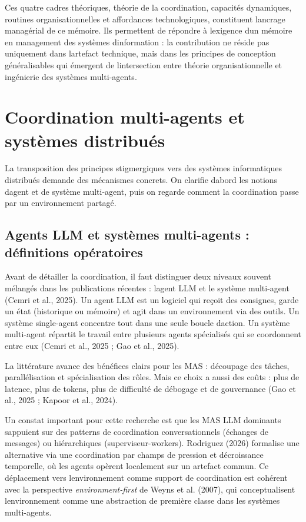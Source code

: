 \documentclass[12pt,a4paper]{article}
\begin{document}
Ces quatre cadres théoriques, théorie de la coordination, capacités
dynamiques, routines organisationnelles et affordances technologiques,
constituent l\textquotesingle ancrage managérial de ce mémoire. Ils
permettent de répondre à l\textquotesingle exigence d\textquotesingle un
mémoire en management des systèmes d\textquotesingle information : la
contribution ne réside pas uniquement dans l\textquotesingle artefact
technique, mais dans les principes de conception
généralisables qui émergent de
l\textquotesingle intersection entre théorie organisationnelle et
ingénierie des systèmes multi-agents.

\section{Coordination multi-agents et systèmes
distribués}\label{coordination-multi-agents-et-systuxe8mes-distribuuxe9s}

La transposition des principes stigmergiques vers des systèmes
informatiques distribués demande des mécanismes concrets. On clarifie
d\textquotesingle abord les notions d\textquotesingle agent et de
système multi-agent, puis on regarde comment la coordination passe par
un environnement partagé.

\subsection{Agents LLM et systèmes multi-agents : définitions
opératoires}\label{agents-llm-et-systuxe8mes-multi-agents--duxe9finitions-opuxe9ratoires}

Avant de détailler la coordination, il faut distinguer deux niveaux
souvent mélangés dans les publications récentes :
l\textquotesingle agent LLM et le système multi-agent (Cemri et al.,
2025). Un agent LLM est un logiciel qui reçoit des consignes, garde un
état (historique ou mémoire) et agit dans un environnement via des
outils. Un système single-agent concentre tout dans une seule boucle
d\textquotesingle action. Un système multi-agent répartit le travail
entre plusieurs agents spécialisés qui se coordonnent entre eux (Cemri
et al., 2025 ; Gao et al., 2025).

La littérature avance des bénéfices clairs pour les MAS : découpage des
tâches, parallélisation et spécialisation des rôles. Mais ce choix a
aussi des coûts : plus de latence, plus de tokens, plus de difficulté de
débogage et de gouvernance (Gao et al., 2025 ; Kapoor et al., 2024).

Un constat important pour cette recherche est que les MAS LLM dominants
s\textquotesingle appuient sur des patterns de coordination
conversationnels (échanges de messages) ou hiérarchiques
(superviseur-workers). Rodriguez (2026) formalise une alternative via
une coordination par champs de pression et décroissance temporelle, où
les agents opèrent localement sur un artefact commun. Ce déplacement
vers l\textquotesingle environnement comme support de coordination est
cohérent avec la perspective \emph{environment-first} de Weyns et al.
(2007), qui conceptualisent l\textquotesingle environnement comme une
abstraction de première classe dans les systèmes multi-agents.
\end{document}
